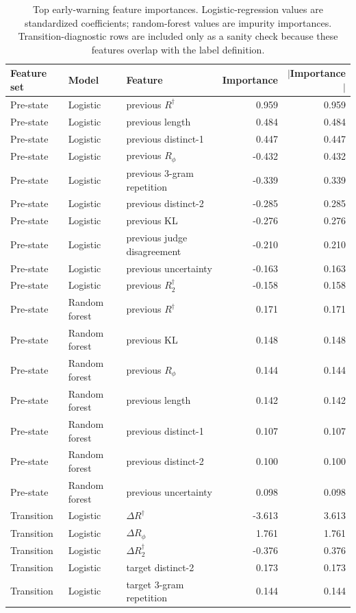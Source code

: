 \documentclass[11pt]{article}
\newcommand{\Rphi}{R_{\phi}}
\newcommand{\Rdag}{R^{\dagger}}
\newcommand{\Rtwo}{R^{\dagger}_2}
\newcommand{\delt}{\Delta}
\begin{document}
\begin{table}[t]
\centering
\small
\caption{Top early-warning feature importances. Logistic-regression values are standardized coefficients; random-forest values are impurity importances. Transition-diagnostic rows are included only as a sanity check because these features overlap with the label definition.}
\label{tab:feature-importance}
\begin{tabular}{lllrr}
\toprule
Feature set & Model & Feature & Importance & $|$Importance$|$ \\
\midrule
Pre-state & Logistic & previous $\Rdag$ & 0.959 & 0.959 \\
Pre-state & Logistic & previous length & 0.484 & 0.484 \\
Pre-state & Logistic & previous distinct-1 & 0.447 & 0.447 \\
Pre-state & Logistic & previous $\Rphi$ & -0.432 & 0.432 \\
Pre-state & Logistic & previous 3-gram repetition & -0.339 & 0.339 \\
Pre-state & Logistic & previous distinct-2 & -0.285 & 0.285 \\
Pre-state & Logistic & previous KL & -0.276 & 0.276 \\
Pre-state & Logistic & previous judge disagreement & -0.210 & 0.210 \\
Pre-state & Logistic & previous uncertainty & -0.163 & 0.163 \\
Pre-state & Logistic & previous $\Rtwo$ & -0.158 & 0.158 \\
\midrule
Pre-state & Random forest & previous $\Rdag$ & 0.171 & 0.171 \\
Pre-state & Random forest & previous KL & 0.148 & 0.148 \\
Pre-state & Random forest & previous $\Rphi$ & 0.144 & 0.144 \\
Pre-state & Random forest & previous length & 0.142 & 0.142 \\
Pre-state & Random forest & previous distinct-1 & 0.107 & 0.107 \\
Pre-state & Random forest & previous distinct-2 & 0.100 & 0.100 \\
Pre-state & Random forest & previous uncertainty & 0.098 & 0.098 \\
\midrule
Transition & Logistic & $\delt\Rdag$ & -3.613 & 3.613 \\
Transition & Logistic & $\delt\Rphi$ & 1.761 & 1.761 \\
Transition & Logistic & $\delt\Rtwo$ & -0.376 & 0.376 \\
Transition & Logistic & target distinct-2 & 0.173 & 0.173 \\
Transition & Logistic & target 3-gram repetition & 0.144 & 0.144 \\
\bottomrule
\end{tabular}
\end{table}
\end{document}
